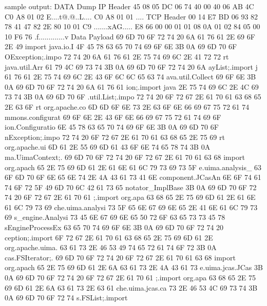 \begin{chunk}{sample output:}
                        DATA Dump                         
IP Header
    45 08 05 DC 06 74 40 00 40 06 AB 4C C0 A8 01 02         E....t@.@..L....
    C0 A8 01 01                                             ....
TCP Header
    00 14 E7 BD 06 93 82 78 41 47 82 2E 80 10 01 C9         .......xAG.....
    E8 66 00 00 01 01 08 0A 01 02 84 05 00 10 F6 76         .f.............v
Data Payload
    69 6D 70 6F 72 74 20 6A 61 76 61 2E 69 6F 2E 49         import java.io.I
    4F 45 78 63 65 70 74 69 6F 6E 3B 0A 69 6D 70 6F         OException;.impo
    72 74 20 6A 61 76 61 2E 75 74 69 6C 2E 41 72 72         rt java.util.Arr
    61 79 4C 69 73 74 3B 0A 69 6D 70 6F 72 74 20 6A         ayList;.import j
    61 76 61 2E 75 74 69 6C 2E 43 6F 6C 6C 65 63 74         ava.util.Collect
    69 6F 6E 3B 0A 69 6D 70 6F 72 74 20 6A 61 76 61         ion;.import java
    2E 75 74 69 6C 2E 4C 69 73 74 3B 0A 69 6D 70 6F         .util.List;.impo
    72 74 20 6F 72 67 2E 61 70 61 63 68 65 2E 63 6F         rt org.apache.co
    6D 6D 6F 6E 73 2E 63 6F 6E 66 69 67 75 72 61 74         mmons.configurat
    69 6F 6E 2E 43 6F 6E 66 69 67 75 72 61 74 69 6F         ion.Configuratio
    6E 45 78 63 65 70 74 69 6F 6E 3B 0A 69 6D 70 6F         nException;.impo
    72 74 20 6F 72 67 2E 61 70 61 63 68 65 2E 75 69         rt org.apache.ui
    6D 61 2E 55 69 6D 61 43 6F 6E 74 65 78 74 3B 0A         ma.UimaContext;.
    69 6D 70 6F 72 74 20 6F 72 67 2E 61 70 61 63 68         import org.apach
    65 2E 75 69 6D 61 2E 61 6E 61 6C 79 73 69 73 5F         e.uima.analysis_
    63 6F 6D 70 6F 6E 65 6E 74 2E 4A 43 61 73 41 6E         component.JCasAn
    6E 6F 74 61 74 6F 72 5F 49 6D 70 6C 42 61 73 65         notator_ImplBase
    3B 0A 69 6D 70 6F 72 74 20 6F 72 67 2E 61 70 61         ;.import org.apa
    63 68 65 2E 75 69 6D 61 2E 61 6E 61 6C 79 73 69         che.uima.analysi
    73 5F 65 6E 67 69 6E 65 2E 41 6E 61 6C 79 73 69         s_engine.Analysi
    73 45 6E 67 69 6E 65 50 72 6F 63 65 73 73 45 78         sEngineProcessEx
    63 65 70 74 69 6F 6E 3B 0A 69 6D 70 6F 72 74 20         ception;.import 
    6F 72 67 2E 61 70 61 63 68 65 2E 75 69 6D 61 2E         org.apache.uima.
    63 61 73 2E 46 53 49 74 65 72 61 74 6F 72 3B 0A         cas.FSIterator;.
    69 6D 70 6F 72 74 20 6F 72 67 2E 61 70 61 63 68         import org.apach
    65 2E 75 69 6D 61 2E 6A 63 61 73 2E 4A 43 61 73         e.uima.jcas.JCas
    3B 0A 69 6D 70 6F 72 74 20 6F 72 67 2E 61 70 61         ;.import org.apa
    63 68 65 2E 75 69 6D 61 2E 6A 63 61 73 2E 63 61         che.uima.jcas.ca
    73 2E 46 53 4C 69 73 74 3B 0A 69 6D 70 6F 72 74         s.FSList;.import

\end{chunk}
